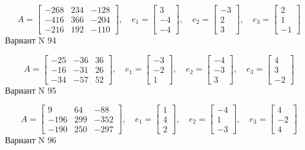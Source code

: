 \documentclass[11pt]{report}
\begin{document}
$$A = \left[\begin{matrix}-268 & 234 & -128\\-416 & 366 & -204\\-216 & 192 & -110\end{matrix}\right],\quad e_1 = \left[\begin{matrix}3\\-4\\-4\end{matrix}\right],\quad e_2 = \left[\begin{matrix}-3\\2\\3\end{matrix}\right],\quad e_3 = \left[\begin{matrix}2\\1\\-1\end{matrix}\right]$$Вариант N 94

$$A = \left[\begin{matrix}-25 & -36 & 36\\-16 & -31 & 26\\-34 & -57 & 52\end{matrix}\right],\quad e_1 = \left[\begin{matrix}-3\\-2\\1\end{matrix}\right],\quad e_2 = \left[\begin{matrix}-4\\-3\\3\end{matrix}\right],\quad e_3 = \left[\begin{matrix}4\\3\\-2\end{matrix}\right]$$Вариант N 95

$$A = \left[\begin{matrix}9 & 64 & -88\\-196 & 299 & -352\\-190 & 250 & -297\end{matrix}\right],\quad e_1 = \left[\begin{matrix}1\\4\\2\end{matrix}\right],\quad e_2 = \left[\begin{matrix}-4\\1\\-3\end{matrix}\right],\quad e_3 = \left[\begin{matrix}4\\-2\\4\end{matrix}\right]$$Вариант N 96
\end{document}

